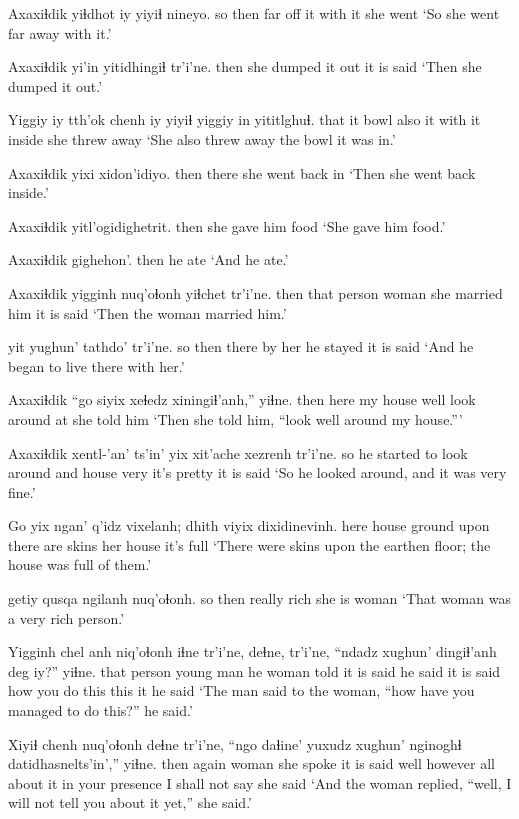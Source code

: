 \documentclass[12pt]{article}
\begin{document}
\gll Axaxiɬdik yiɬdhot iy yiyiɬ  nineyo.
{so then} {far off} it {with it} {she went}
\glt `So she went far away with it.'
\glend

\gll Axaxiɬdik {yi'in yitidhingiɬ} tr'i'ne.
then  {she dumped it out} {it is said}
\glt `Then she dumped it out.'
\glend

\gll Yiggiy iy tth'ok  chenh iy yiyiɬ yiggiy  {in yititlghuɬ.}
that it bowl  also it {with it} inside  {she threw away}
\glt `She also threw away the bowl it was in.'
\glend

\gll Axaxiɬdik yixi xidon'idiyo.
then  there {she went back in}
\glt `Then she went back inside.'
\glend

\gll Axaxiɬdik yitl'ogidighetrit.
then {she gave him food}
\glt `She gave him food.'
\glend

\gll Axaxiɬdik gighehon'.
then  {he ate}
\glt `And he ate.'
\glend

\gll Axaxiɬdik yigginh nuq'oɬonh yiɬchet tr'i'ne.
then  {that person} woman {she married him} {it is said}
\glt `Then the woman married him.'
\glend

 yit yughun' tathdo' tr'i'ne.
{so then} there {by her} {he stayed} {it is said}
\glt `And he began to live there with her.'
\glend

\gll Axaxiɬdik ``go siyix  xeɬedz xiningiɬ'anh,'' yiɬne.
then  here {my house} well  {look around at} {she told him}
\glt `Then she told him, ``look well around my house.'''
\glend

\gll Axaxiɬdik xentl-'an' ts'in' yix xit'ache xezrenh tr'i'ne.
so {he started to look around} and house very {it's pretty} {it is said}
\glt `So he looked around, and it was very fine.'
\glend

\gll Go yix ngan'  q'idz vixelanh; dhith viyix dixidinevinh.
here house ground  upon {there are} skins {her house} {it's full}
\glt `There were skins upon the earthen floor; the house was full of them.'
\glend

 getiy qusqa  ngilanh nuq'oɬonh.
{so then}  really rich {she is} woman
\glt `That woman was a very rich person.'
\glend

\gll Yigginh chel anh niq'oɬonh iɬne tr'i'ne, deɬne, tr'i'ne, {``ndadz xughun'} dingiɬ'anh deg iy?'' yiɬne.
{that person} {young man} he woman told {it is said} {he said} {it is said} how  {you do this} this it {he said}
\glt `The man said to the woman, ``how have you managed to do this?'' he said.' 
\glend

\gll Xiyiɬ chenh nuq'oɬonh deɬne  tr'i'ne, ``ngo daɬine' yuxudz xughun' nginoghɬ  datidhasnelts'in','' yiɬne.
then again woman  {she spoke}  {it is said} well however  all {about it} {in your presence} {I shall not say} {she said}
\glt `And the woman replied, ``well, I will not tell you about it yet,'' she said.'
\glend
\end{document}
